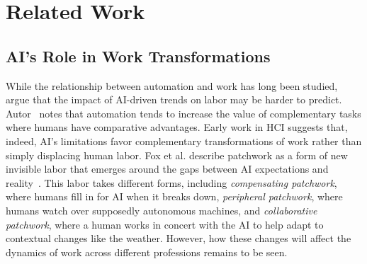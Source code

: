 \section{Related Work}
\subsection{AI's Role in Work Transformations}

While the relationship between automation and work has long been studied,
\cite{frank2019toward} argue that the impact of AI-driven trends on labor may be harder to predict.
Autor~\cite{autor2015there} notes that automation tends to increase the value of complementary tasks where humans have comparative advantages.
Early work in HCI suggests that, indeed, AI's limitations favor complementary transformations of work rather than simply displacing human labor. Fox et al. describe patchwork as a form of new invisible labor that emerges around the gaps between AI expectations and reality~\cite{fox2023patchwork}. This labor takes different forms, including \textit{compensating patchwork}, where humans fill in for AI when it breaks down, \textit{peripheral patchwork}, where humans watch over supposedly autonomous machines, and \textit{collaborative patchwork}, where a human works in concert with the AI to help adapt to contextual changes like the weather. However, how these changes will affect the dynamics of work across different professions remains to be seen.


